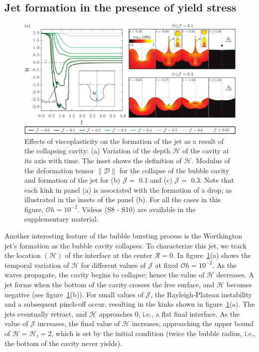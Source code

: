 \documentclass[final]{jfm}
\begin{document}
\subsection{Jet formation in the presence of yield stress}\label{Sec::JetFormation}
 \begin{figure}
	\centerline{\includegraphics[width=\linewidth]{Figures/Figure4_LateTimes-eps-converted-to.pdf}}%
	\caption{Effects of viscoplasticity on the formation of the jet as a result of the collapsing cavity: (a) Variation of the depth $\mathcal{H}$ of the cavity at its axis with time. The inset shows the definition of $\mathcal{H}$. Modulus of the deformation tensor $\|\boldsymbol{\mathcal{D}}\|$ for the collapse of the bubble cavity and formation of the jet for (b) $\mathcal{J} =$  0.1 and (c) $\mathcal{J} =$ 0.3. Note that each kink in panel (a) is associated with the formation of a drop, as illustrated in the insets of the panel (b). For all the cases in this figure, $\mathcal{O}h = 10^{-2}$. Videos (S8 - S10) are available in the supplementary material.}
	\label{fig:Jcar_LateTimes}
\end{figure}
Another interesting feature of the bubble bursting process is the Worthington jet's formation as the bubble cavity collapses. To characterize this jet, we track the location $\left(\mathcal{H}\right)$ of the interface at the center $\mathcal{R} = 0$. 
In figure~\ref{fig:Jcar_LateTimes}(a) shows the temporal variation of $\mathcal{H}$ for different values of $\mathcal{J}$ at fixed $\mathcal{O}h = 10^{-2}$. As the waves propagate, the cavity begins to collapse; hence the value of $\mathcal{H}$ decreases. A jet forms when the bottom of the cavity crosses the free surface, and $\mathcal{H}$ becomes negative (see figure~\ref{fig:Jcar_LateTimes}(b)). For small values of $\mathcal{J}$, the Rayleigh-Plateau instability and a subsequent pinch-off occur, resulting in the kinks shown in figure~\ref{fig:Jcar_LateTimes}(a). The jets eventually retract, and $\mathcal{H}$ approaches $0$, i.e., a flat final interface. As the value of $\mathcal{J}$ increases, the final value of $\mathcal{H}$ increases, approaching the upper bound of $\mathcal{H} = \mathcal{H}_i = 2$, which is set by the initial condition (twice the bubble radius, i.e., the bottom of the cavity never yields). 
\end{document}
